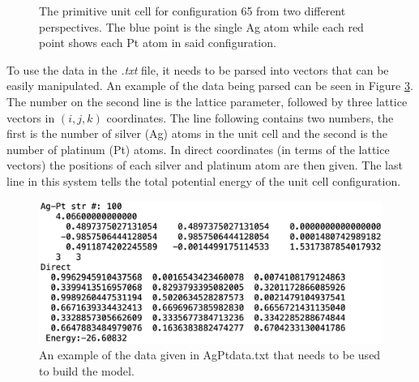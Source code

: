 \begin{figure}
\begin{subfigure}{0.23\textwidth}
    \label{primitiveSecond}
  \end{subfigure}%
\caption{The primitive unit cell for configuration 65 from two different perspectives. The blue point is the single Ag atom while each red point shows each Pt atom in said configuration.} \label{primitiveUnitCells}
\end{figure}

\par To use the data in the \textit{.txt} file, it needs to be parsed into vectors that can be easily manipulated. An example of the data being parsed can be seen in Figure \ref{system2data}. The number on the second line is the lattice parameter, followed by three lattice vectors in $(i,j,k)$ coordinates. The line following contains two numbers, the first is the number of silver (Ag) atoms in the unit cell and the second is the number of platinum (Pt) atoms. In direct coordinates (in terms of the lattice vectors) the positions of each silver and platinum atom are then given. The last line in this system tells the total potential energy of the unit cell configuration. 

\begin{figure}[h]
\includegraphics[scale = 0.3]{Figures/system2}
\caption{An example of the data given in AgPtdata.txt that needs to be used to build the model.
\label{system2data}} 
\end{figure}

